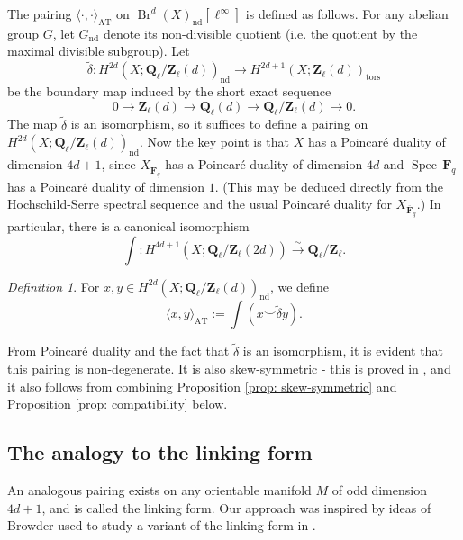 \documentclass[10pt, reqno]{amsart}
\numberwithin{equation}{subsection}
\newcommand{\F}{\mathbf{F}}
\newcommand{\wt}[1]{\widetilde{#1}}
\newcommand{\Q}{\mathbf{Q}}
\newcommand{\Z}{\mathbf{Z}}
\newcommand{\ol}[1]{\overline{#1}}
\newcommand{\mrm}[1]{\mathrm{#1}}
\newcommand{\co}{\colon}
\DeclareMathOperator{\et}{\acute{e}t}
\DeclareMathOperator{\Spec}{Spec\,}
\DeclareMathOperator{\Br}{Br}
\DeclareMathOperator{\nd}{nd}
\DeclareMathOperator{\tors}{tors}
\theoremstyle{remark}
\newtheorem{defn}[thm]{Definition}
\begin{document}
 
 The pairing $\langle  \cdot, \cdot \rangle_{\mrm{AT}} $ on $ \Br^d(X)_{\nd}[\ell^{\infty}] $ is defined as follows. For any abelian group $G$, let $G_{\nd}$ denote its non-divisible quotient (i.e. the quotient by the maximal divisible subgroup). Let 
\[
\wt{\delta} \co H_{\et}^{2d}(X; \Q_{\ell}/\Z_{\ell}(d))_{\nd} \rightarrow H_{\et}^{2d+1}(X; \Z_{\ell}(d))_{\tors}
\]
be the boundary map induced by the short exact sequence 
\[
0 \rightarrow \Z_{\ell}(d) \rightarrow \Q_{\ell}(d)\rightarrow  \Q_{\ell}/\Z_{\ell}(d) \rightarrow 0.
\]
The map $\wt{\delta}$ is an isomorphism, so it suffices to define a pairing on $H_{\et}^{2d}(X; \Q_{\ell}/\Z_{\ell}(d))_{\nd}$. Now the key point is that $X$ has a Poincar\'{e} duality of dimension $4d+1$, since $X_{\ol{\F}_q}$ has a Poincar\'{e} duality of dimension $4d$ and  $\Spec\F_q$ has a Poincar\'{e} duality of dimension $1$. (This may be deduced directly from the Hochschild-Serre spectral sequence and the usual Poincar\'{e} duality for $X_{\ol{\F}_q}$.) In particular, there is a canonical isomorphism 
\[
\int \co H^{4d+1}_{\et}(X; \Q_{\ell}/\Z_{\ell}(2d))  \xrightarrow{\sim} \Q_{\ell}/\Z_{\ell}.
\]


\begin{defn}
For $x,y \in H^{2d}_{\et}(X; \Q_{\ell}/\Z_{\ell}(d))_{\nd}$, we define 
\[
\langle x, y \rangle_{\mrm{AT}} := \int (x \smile \wt{\delta} y).
\]
\end{defn}

From Poincar\'{e} duality and the fact that $\wt{\delta}$ is an isomorphism, it is evident that this pairing is non-degenerate. It is also skew-symmetric - this is proved in \cite[\S 3]{Jahn15}, and it also follows from combining Proposition \ref{prop: skew-symmetric} and Proposition \ref{prop: compatibility} below. 

\subsection{The analogy to the linking form}\label{subsec: analogy linking form}

An analogous pairing exists on any orientable manifold $M$ of odd dimension $4d+1$, and is called the linking form. Our approach was inspired by ideas of Browder used to study a variant of the linking form in \cite{Browdb}.
\end{document}
